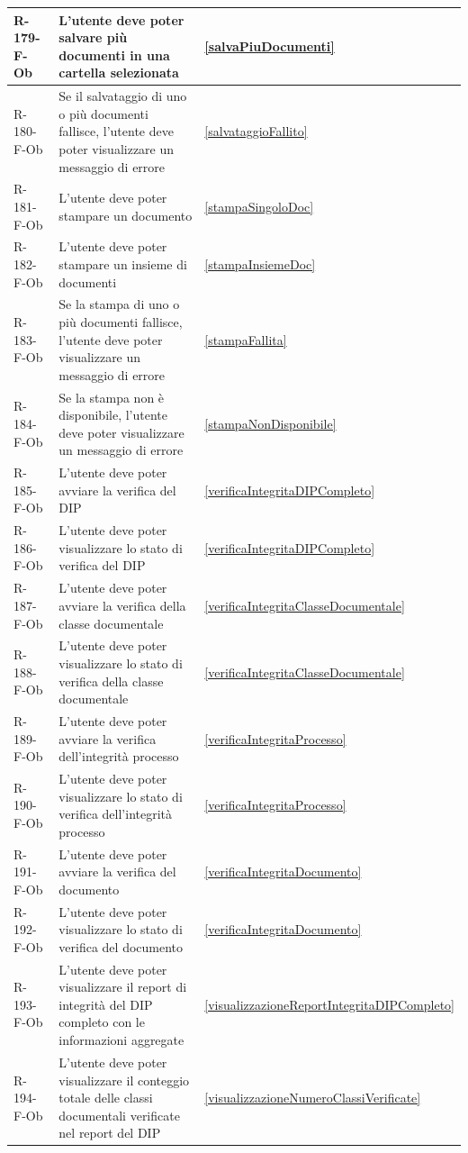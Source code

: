 \begin{longtable}{|p{2.5cm}|p{9.5cm}|p{2.5cm}|}
R-179-F-Ob & L'utente deve poter salvare più documenti in una cartella selezionata & \ref{salvaPiuDocumenti} \\
\hline
R-180-F-Ob & Se il salvataggio di uno o più documenti fallisce, l'utente deve poter visualizzare un messaggio di errore & \ref{salvataggioFallito} \\
\hline
R-181-F-Ob & L'utente deve poter stampare un documento & \ref{stampaSingoloDoc} \\
\hline
R-182-F-Ob & L'utente deve poter stampare un insieme di documenti & \ref{stampaInsiemeDoc} \\
\hline
R-183-F-Ob & Se la stampa di uno o più documenti fallisce, l'utente deve poter visualizzare un messaggio di errore & \ref{stampaFallita} \\
\hline
R-184-F-Ob & Se la stampa non è disponibile, l'utente deve poter visualizzare un messaggio di errore & \ref{stampaNonDisponibile} \\
\hline
R-185-F-Ob & L'utente deve poter avviare la verifica del DIP & \ref{verificaIntegritaDIPCompleto} \\
\hline
R-186-F-Ob & L'utente deve poter visualizzare lo stato di verifica del DIP & \ref{verificaIntegritaDIPCompleto} \\
\hline
R-187-F-Ob & L'utente deve poter avviare la verifica della classe documentale & \ref{verificaIntegritaClasseDocumentale}\\
\hline
R-188-F-Ob & L'utente deve poter visualizzare lo stato di verifica della classe documentale & \ref{verificaIntegritaClasseDocumentale} \\
\hline
R-189-F-Ob & L'utente deve poter avviare la verifica dell'integrità processo & \ref{verificaIntegritaProcesso} \\
\hline
R-190-F-Ob & L'utente deve poter visualizzare lo stato di verifica dell'integrità processo & \ref{verificaIntegritaProcesso} \\
\hline
R-191-F-Ob & L'utente deve poter avviare la verifica del documento & \ref{verificaIntegritaDocumento} \\
\hline
R-192-F-Ob & L'utente deve poter visualizzare lo stato di verifica del documento & \ref{verificaIntegritaDocumento} \\
\hline
R-193-F-Ob & L'utente deve poter visualizzare il report di integrità del DIP completo con le informazioni aggregate & \ref{visualizzazioneReportIntegritaDIPCompleto} \\
\hline
R-194-F-Ob & L'utente deve poter visualizzare il conteggio totale delle classi documentali verificate nel report del DIP & \ref{visualizzazioneNumeroClassiVerificate} \\

\end{longtable}
